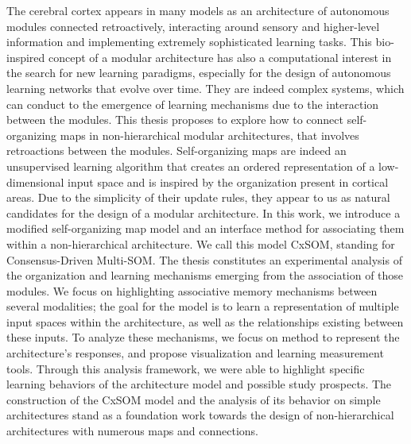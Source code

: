 \documentclass[11pt]{thesul-cs}
\begin{document}
\begin{ThesisAbstract}
\begin{FrenchAbstract}
  \end{FrenchAbstract}
  \pagebreak
  \begin{EnglishAbstract}
    The cerebral cortex appears in many models as an architecture of autonomous modules connected retroactively, interacting around sensory and higher-level information and implementing extremely sophisticated learning tasks. 
    This bio-inspired concept of a modular architecture has also a computational interest in the search for new learning paradigms, especially for the design of autonomous learning networks that evolve over time. They are indeed complex systems, which can conduct to the emergence of learning mechanisms due to the interaction between the modules.
    This thesis proposes to explore how to connect self-organizing maps in non-hierarchical modular architectures, that involves retroactions between the modules. 
    Self-organizing maps are indeed an unsupervised learning algorithm that creates an ordered representation of a low-dimensional input space and is inspired by the organization present in cortical areas. 
    Due to the simplicity of their update rules, they appear to us as natural candidates for the design of a modular architecture.
    In this work, we introduce a modified self-organizing map model and an interface method for associating them within a non-hierarchical architecture. We call this model CxSOM, standing for Consensus-Driven Multi-SOM.
    The thesis constitutes an experimental analysis of the organization and learning mechanisms emerging from the association of those modules. 
    We focus on highlighting associative memory mechanisms between several modalities; the goal for the model is to learn a representation of multiple input spaces within the architecture, as well as the relationships existing between these inputs.
    To analyze these mechanisms, we focus on method to represent the architecture's responses, and propose visualization and learning measurement tools. Through this analysis framework, we were able to highlight specific learning behaviors of the architecture model and possible study prospects. The construction of the CxSOM model and the analysis of its behavior on simple architectures stand as a foundation work towards the design of non-hierarchical architectures with numerous maps and connections.
   
    \end{EnglishAbstract}
  \end{ThesisAbstract}

\setcounter{tocdepth}{1}
\tableofcontents

%
\mainmatter











 \printbibliography
\end{document}
